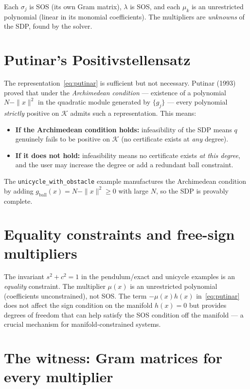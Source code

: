 \documentclass[11pt]{article}
\begin{document}
Each $\sigma_j$ is SOS (its own Gram matrix), $\lambda$ is SOS, and each
$\mu_k$ is an unrestricted polynomial (linear in its monomial coefficients).
The multipliers are \emph{unknowns} of the SDP, found by the solver.

\section{Putinar's Positivstellensatz}

The representation~\eqref{eq:putinar} is sufficient but not necessary.
Putinar (1993) proved that under the \emph{Archimedean condition} —
existence of a polynomial $N - \|x\|^2$ in the quadratic module generated
by $\{g_j\}$ — every polynomial \emph{strictly} positive on $\mathcal{K}$
admits such a representation. This means:

\begin{itemize}
  \item \textbf{If the Archimedean condition holds:} infeasibility of
    the SDP means $q$ genuinely fails to be positive on $\mathcal{K}$
    (no certificate exists at \emph{any} degree).
  \item \textbf{If it does not hold:} infeasibility means no certificate
    exists \emph{at this degree}, and the user may increase the degree
    or add a redundant ball constraint.
\end{itemize}

The \texttt{unicycle\_with\_obstacle} example manufactures the Archimedean
condition by adding $g_{\mathrm{ball}}(x) = N - \|x\|^2 \ge 0$ with
large $N$, so the SDP is provably complete.

\section{Equality constraints and free-sign multipliers}

The invariant $s^2 + c^2 = 1$ in the pendulum/exact and unicycle examples
is an \emph{equality} constraint. The multiplier $\mu(x)$ is an unrestricted
polynomial (coefficients unconstrained), not SOS. The term $-\mu(x)h(x)$
in~\eqref{eq:putinar} does not affect the sign condition on the manifold
$h(x) = 0$ but provides degrees of freedom that can help satisfy the SOS
condition off the manifold — a crucial mechanism for manifold-constrained
systems.

\section{The witness: Gram matrices for every multiplier}
\end{document}
